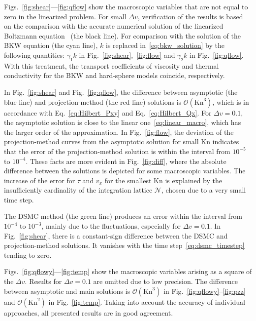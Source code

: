 \documentclass[aip,pof,preprint]{revtex4-1}
\newcommand{\Kn}{\mathrm{Kn}}
\newcommand{\OO}[1]{\mathcal{O}(#1)}
\begin{document}
Figs.~\ref{fig:shear}---\ref{fig:qflow} show the macroscopic variables
that are not equal to zero in the linearized problem.
For small \(\Delta{v}\), verification of the results is based on the comparison with the accurate numerical solution
of the linearized Boltzmann equation~\cite{Ohwada1990} (the black line).
For comparison with the solution of the BKW equation (the cyan line),
\(k\) is replaced in~\eqref{eq:bkw_solution} by the following quantities:
\(\gamma_1k\) in Fig.~\ref{fig:shear},~\ref{fig:flow} and \(\gamma_2k\) in Fig.~\ref{fig:qflow}.
With this treatment, the transport coefficients of viscosity and thermal conductivity
for the BKW and hard-sphere models coincide, respectively.

In Fig.~\ref{fig:shear} and Fig.~\ref{fig:qflow}, the difference between asymptotic (the blue line)
and projection-method (the red line) solutions is \(\OO{\Kn^3}\),
which is in accordance with Eq.~\eqref{eq:Hilbert_Pxy} and Eq.~\eqref{eq:Hilbert_Qx}.
For \(\Delta{v}=0.1\), the asymptotic solution is close to the linear one~\eqref{eq:linear_macro},
which has the larger order of the approximation.
In Fig.~\ref{fig:flow}, the deviation of the projection-method curves
from the asymptotic solution for small \(\Kn\) indicates that
the error of the projection-method solution is within the interval from \(10^{-5}\) to \(10^{-4}\).
These facts are more evident in Fig.~\ref{fig:diff},
where the absolute difference between the solutions
is depicted for some macroscopic variables.
The increase of the error for \(\tau\) and \(v_x\) for the smallest \(\Kn\)
is explained by the insufficiently cardinality of the integration lattice \(\mathcal{N}\),
chosen due to a very small time step.

The DSMC method (the green line) produces an error within the interval from \(10^{-4}\) to \(10^{-3}\),
mainly due to the fluctuations, especially for \(\Delta{v}=0.1\).
In Fig.~\ref{fig:shear}, there is a constant-sign difference
between the DSMC and projection-method solutions.
It vanishes with the time step~\eqref{eq:dsmc_timestep} tending to zero.

Figs.~\ref{fig:qflowy}---\ref{fig:temp} show the macroscopic variables
arising as a square of the \(\Delta{v}\).
Results for \(\Delta{v}=0.1\) are omitted due to low precision.
The difference between asymptotic and main solutions
is \(\OO{\Kn^3}\) in Fig.~\ref{fig:qflowy}--\ref{fig:pzz} and \(\OO{\Kn^2}\) in Fig.~\ref{fig:temp}.
Taking into account the accuracy of individual approaches,
all presented results are in good agreement.
\end{document}
